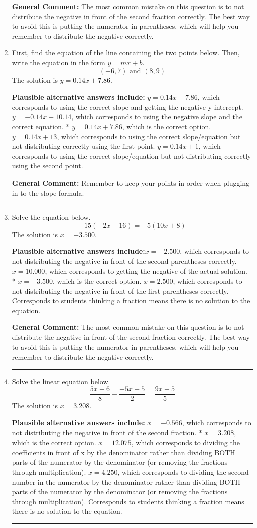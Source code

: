 \documentclass{extbook}[14pt]
\newcommand{\litem}[1]{\item #1

\rule{\textwidth}{0.4pt}}
\begin{document}
\begin{enumerate}
{\textbf{General Comment:} The most common mistake on this question is to not distribute the negative in front of the second fraction correctly. The best way to avoid this is putting the numerator in parentheses, which will help you remember to distribute the negative correctly.
}
\litem{
First, find the equation of the line containing the two points below. Then, write the equation in the form $ y=mx+b $.
\[ (-6, 7) \text{ and } (8, 9) \]The solution is \( y = 0.14x + 7.86 \).\begin{enumerate}[label=\Alph*.]
\textbf{Plausible alternative answers include:} $y = 0.14x -7.86$, which corresponds to using the correct slope and getting the negative y-intercept.
 $y = -0.14x + 10.14$, which corresponds to using the negative slope and the correct equation.
* $y = 0.14x + 7.86$, which is the correct option.
 $y = 0.14x + 13$, which corresponds to using the correct slope/equation but not distributing correctly using the first point.
 $y = 0.14x + 1$, which corresponds to using the correct slope/equation but not distributing correctly using the second point.
\end{enumerate}

\textbf{General Comment:} Remember to keep your points in order when plugging in to the slope formula.
}
\litem{
Solve the equation below.
\[ -15(-2x -16) = -5(10x + 8) \]The solution is \( x = -3.500 \).\begin{enumerate}[label=\Alph*.]
\textbf{Plausible alternative answers include:}$x = -2.500$, which corresponds to not distributing the negative in front of the second parentheses correctly.
$x = 10.000$, which corresponds to getting the negative of the actual solution.
* $x = -3.500$, which is the correct option.
$x = 2.500$, which corresponds to not distributing the negative in front of the first parentheses correctly.
Corresponds to students thinking a fraction means there is no solution to the equation.
\end{enumerate}

\textbf{General Comment:} The most common mistake on this question is to not distribute the negative in front of the second fraction correctly. The best way to avoid this is putting the numerator in parentheses, which will help you remember to distribute the negative correctly.
}
\litem{
Solve the linear equation below.
\[ \frac{5x -6}{8} - \frac{-5x + 5}{2} = \frac{9x + 5}{5} \]The solution is \( x = 3.208 \).\begin{enumerate}[label=\Alph*.]
\textbf{Plausible alternative answers include:} $x = -0.566$, which corresponds to not distributing the negative in front of the second fraction.
* $x = 3.208$, which is the correct option.
 $x = 12.075$, which corresponds to dividing the coefficients in front of x by the denominator rather than dividing BOTH parts of the numerator by the denominator (or removing the fractions through multiplication).
 $x = 4.250$, which corresponds to dividing the second number in the numerator by the denominator rather than dividing BOTH parts of the numerator by the denominator (or removing the fractions through multiplication).
Corresponds to students thinking a fraction means there is no solution to the equation.
\end{enumerate}

}
\end{enumerate}
\end{document}
